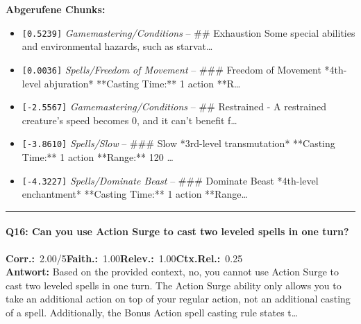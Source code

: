 \noindent\textbf{Abgerufene Chunks:}
\begin{itemize}[noitemsep, topsep=2pt]
  \item[\textbf{\#1}] \texttt{[0.5239]} \textit{Gamemastering/Conditions} -- \#\# Exhaustion  Some special abilities and environmental hazards, such as starvat\ldots
  \item[\textbf{\#2}] \texttt{[0.0036]} \textit{Spells/Freedom of Movement} -- \#\#\# Freedom of Movement  *4th-level abjuration*  **Casting Time:** 1 action  **R\ldots
  \item[\textbf{\#3}] \texttt{[-2.5567]} \textit{Gamemastering/Conditions} -- \#\# Restrained  - A restrained creature's speed becomes 0, and it can't benefit f\ldots
  \item[\textbf{\#4}] \texttt{[-3.8610]} \textit{Spells/Slow} -- \#\#\# Slow  *3rd-level transmutation*  **Casting Time:** 1 action  **Range:** 120 \ldots
  \item[\textbf{\#5}] \texttt{[-4.3227]} \textit{Spells/Dominate Beast} -- \#\#\# Dominate Beast  *4th-level enchantment*  **Casting Time:** 1 action  **Range\ldots
\end{itemize}
\vspace{4pt}
\hrule
\vspace{6pt}

\paragraph{Q16: Can you use Action Surge to cast two leveled spells in one turn?}
\noindent \textbf{Corr.:}~2.00/5\quad \textbf{Faith.:}~1.00\quad \textbf{Relev.:}~1.00\quad \textbf{Ctx.Rel.:}~0.25\\

\noindent\textbf{Antwort:} Based on the provided context, no, you cannot use Action Surge to cast two leveled spells in one turn. The Action Surge ability only allows you to take an additional action on top of your regular action, not an additional casting of a spell. Additionally, the Bonus Action spell casting rule states t\ldots

